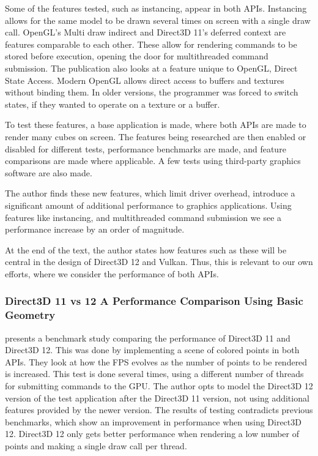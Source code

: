 Some of the features tested, such as instancing, appear in both \glspl{API}.
Instancing allows for the same model to be drawn several times on screen with a single draw call.
OpenGL’s Multi draw indirect and Direct3D 11’s deferred context are features comparable to each other.
These allow for rendering commands to be stored before execution, opening the door for multithreaded command submission.
The publication also looks at a feature unique to OpenGL, Direct State Access.
Modern OpenGL allows direct access to buffers and textures without binding them.
In older versions, the programmer was forced to switch states, if they wanted to operate on a texture or a buffer.


To test these features, a base application is made, where both \glspl{API} are made to render many cubes on screen.
The features being researched are then enabled or disabled for different tests, performance benchmarks are made, and feature comparisons are made where applicable.
A few tests using third-party graphics software are also made.


The author finds these new features, which limit driver overhead, introduce a significant amount of additional performance to graphics applications.
Using features like instancing, and multithreaded command submission we see a performance increase by an order of magnitude.


At the end of the text, the author states how features such as these will be central in the design of Direct3D 12 and Vulkan.
Thus, this is relevant to our own efforts, where we consider the performance of both \glspl{API}.

\subsubsection{Direct3D 11 vs 12 A Performance Comparison Using Basic Geometry}
\citet{2016_direct3d} presents a benchmark study comparing the performance of Direct3D 11 and Direct3D 12.
This was done by implementing a scene of colored points in both \glspl{API}. 
They look at how the \gls{FPS} evolves as the number of points to be rendered is increased.
This test is done several times, using a different number of threads for submitting commands to the \gls{GPU}. 
The author opts to model the Direct3D 12 version of the test application after the Direct3D 11 version, not using additional features provided by the newer version. 
The results of testing contradicts previous benchmarks, which show an improvement in performance when using Direct3D 12.
Direct3D 12 only gets better performance when rendering a low number of points and making a single draw call per thread.


